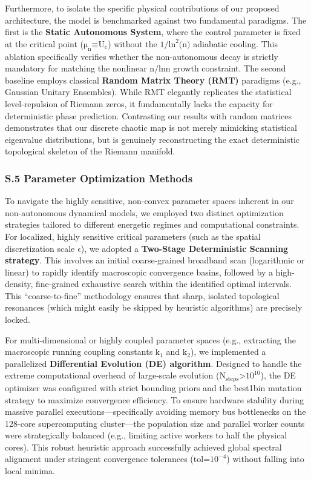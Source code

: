 Furthermore, to isolate the specific physical contributions of our
proposed architecture, the model is benchmarked against two fundamental
paradigms. The first is the \textbf{Static Autonomous System}, where the
control parameter is fixed at the critical point
(\(\text{μ}_{\text{n}}\text{≡}\text{U}_{\text{c}}\)) without the
\(\text{1/}\text{ln}^{\text{2}}\text{(}\text{n}\text{)}\) adiabatic
cooling. This ablation specifically verifies whether the non-autonomous
decay is strictly mandatory for matching the nonlinear
\(\text{n}\text{/ln}\text{n}\) growth constraint. The second baseline
employs classical \textbf{Random Matrix Theory (RMT)} paradigms (e.g.,
Gaussian Unitary Ensembles). While RMT elegantly replicates the
statistical level-repulsion of Riemann zeros, it fundamentally lacks the
capacity for deterministic phase prediction. Contrasting our results
with random matrices demonstrates that our discrete chaotic map is not
merely mimicking statistical eigenvalue distributions, but is genuinely
reconstructing the exact deterministic topological skeleton of the
Riemann manifold.

\hypertarget{s.5-parameter-optimization-methods}{%
\subsubsection{\texorpdfstring{\textbf{S.5 Parameter Optimization
Methods}}{S.5 Parameter Optimization Methods}}\label{s.5-parameter-optimization-methods}}

To navigate the highly sensitive, non-convex parameter spaces inherent
in our non-autonomous dynamical models, we employed two distinct
optimization strategies tailored to different energetic regimes and
computational constraints. For localized, highly sensitive critical
parameters (such as the spatial discretization scale \(\text{ϵ}\)), we
adopted a \textbf{Two-Stage Deterministic Scanning strategy}. This
involves an initial coarse-grained broadband scan (logarithmic or
linear) to rapidly identify macroscopic convergence basins, followed by
a high-density, fine-grained exhaustive search within the identified
optimal intervals. This ``coarse-to-fine'' methodology ensures that
sharp, isolated topological resonances (which might easily be skipped by
heuristic algorithms) are precisely locked.

For multi-dimensional or highly coupled parameter spaces (e.g.,
extracting the macroscopic running coupling constants
\(\text{k}_{\text{1}}\) and \(\text{k}_{\text{2}}\)), we implemented a
parallelized \textbf{Differential Evolution (DE) algorithm}. Designed to
handle the extreme computational overhead of large-scale evolution
(\(\text{N}_{\text{steps}}\text{>}\text{10}^{\text{10}}\)), the DE
optimizer was configured with strict bounding priors and the best1bin
mutation strategy to maximize convergence efficiency. To ensure hardware
stability during massive parallel executions---specifically avoiding
memory bus bottlenecks on the 128-core supercomputing cluster---the
population size and parallel worker counts were strategically balanced
(e.g., limiting active workers to half the physical cores). This robust
heuristic approach successfully achieved global spectral alignment under
stringent convergence tolerances (\(\text{tol=}\text{10}^{\text{−4}}\))
without falling into local minima.
